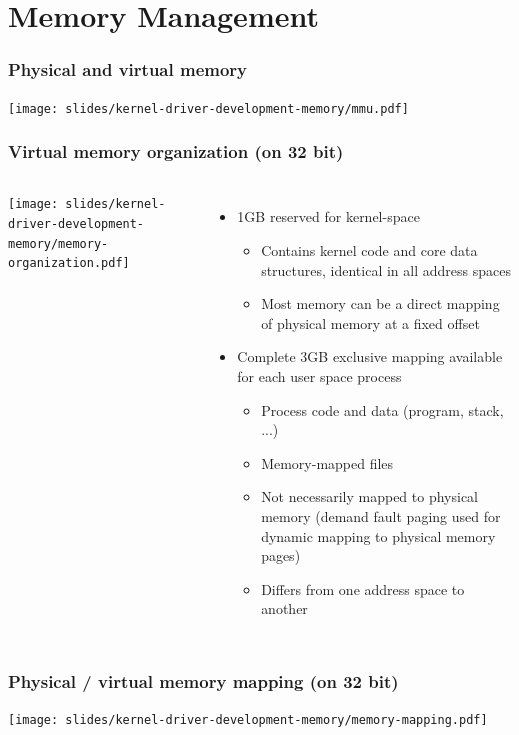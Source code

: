 \section{Memory Management}

\begin{frame}
  \frametitle{Physical and virtual memory}
  \begin{center}
    \texttt{[image: slides/kernel-driver-development-memory/mmu.pdf]}
  \end{center}
\end{frame}

\begin{frame}
  \frametitle{Virtual memory organization (on 32 bit)}
  \begin{columns}
    \texttt{[image: slides/kernel-driver-development-memory/memory-organization.pdf]}
    \begin{itemize}
    \item 1GB reserved for kernel-space
      \begin{itemize}
      \item Contains kernel code and core data structures, identical
        in all address spaces
      \item Most memory can be a direct mapping of physical memory at
        a fixed offset
      \end{itemize}
    \item Complete 3GB exclusive mapping available for each user space
      process
      \begin{itemize}
      \item Process code and data (program, stack, ...)
      \item Memory-mapped files
      \item Not necessarily mapped to physical memory (demand fault
        paging used for dynamic mapping to physical memory pages)
      \item Differs from one address space to another
      \end{itemize}
    \end{itemize}
  \end{columns}
\end{frame}

\begin{frame}
  \frametitle{Physical / virtual memory mapping (on 32 bit)}
  \begin{center}
    \texttt{[image: slides/kernel-driver-development-memory/memory-mapping.pdf]}
  \end{center}
\end{frame}

